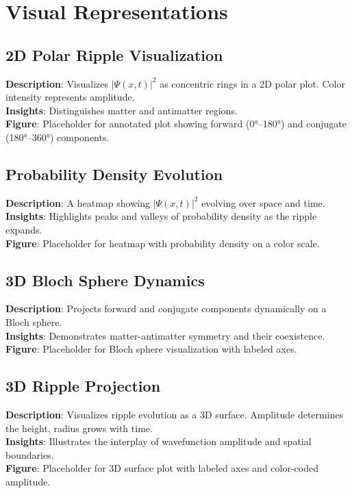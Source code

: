 \documentclass[12pt]{article}
\begin{document}
\section{Visual Representations}
\subsection{2D Polar Ripple Visualization}
\textbf{Description}: Visualizes \(|\Psi(x, t)|^2\) as concentric rings in a 2D polar plot. Color intensity represents amplitude. \\
\textbf{Insights}: Distinguishes matter and antimatter regions. \\
\textbf{Figure}: Placeholder for annotated plot showing forward (0°–180°) and conjugate (180°–360°) components.

\subsection{Probability Density Evolution}
\textbf{Description}: A heatmap showing \(|\Psi(x, t)|^2\) evolving over space and time. \\
\textbf{Insights}: Highlights peaks and valleys of probability density as the ripple expands. \\
\textbf{Figure}: Placeholder for heatmap with probability density on a color scale.

\subsection{3D Bloch Sphere Dynamics}
\textbf{Description}: Projects forward and conjugate components dynamically on a Bloch sphere. \\
\textbf{Insights}: Demonstrates matter-antimatter symmetry and their coexistence. \\
\textbf{Figure}: Placeholder for Bloch sphere visualization with labeled axes.

\subsection{3D Ripple Projection}
\textbf{Description}: Visualizes ripple evolution as a 3D surface. Amplitude determines the height, radius grows with time. \\
\textbf{Insights}: Illustrates the interplay of wavefunction amplitude and spatial boundaries. \\
\textbf{Figure}: Placeholder for 3D surface plot with labeled axes and color-coded amplitude.
\end{document}
